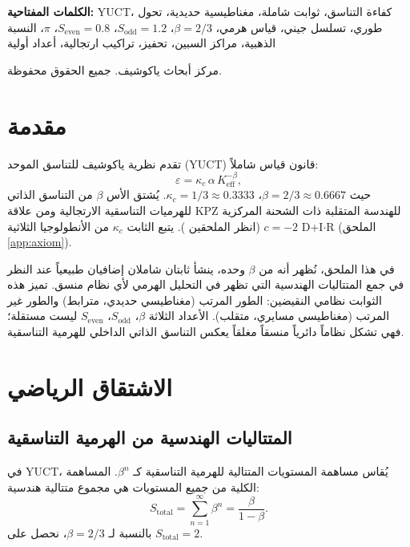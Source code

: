 \documentclass[11pt,a4paper]{article}
\begin{document}
\begin{titlepage}
\begin{center}
			\vspace{0.5cm}
			\noindent
			\footnotesize\textbf{الكلمات المفتاحية:} YUCT، كفاءة التناسق، ثوابت شاملة، مغناطيسية حديدية، تحول طوري، تسلسل جيني، قياس هرمي، \(\beta = 2/3\)، \(S_{\text{odd}} = 1.2\)، \(S_{\text{even}} = 0.8\)، \(\pi\)، النسبة الذهبية، مراكز السبين، تحفيز، تراكيب ارتجالية، أعداد أولية
			
			\vspace{0.3cm}
			\noindent
			\footnotesize{} مركز أبحاث ياكوشيف. جميع الحقوق محفوظة.
		\end{center}
	\end{titlepage}
	
	\tableofcontents
	\newpage
	
	\section{مقدمة}
	تقدم نظرية ياكوشيف للتناسق الموحد (YUCT) قانون قياس شاملاً:
	\[
	\varepsilon = \kappa_c \, \alpha \, K_{\mathrm{eff}}^{-\beta},
	\]
	حيث \(\beta = 2/3 \approx 0.6667\)، \(\kappa_c = 1/3 \approx 0.3333\). يُشتق الأس \(\beta\) من التناسق الذاتي للهرميات التناسقية الارتجالية ومن علاقة KPZ للهندسة المتقلبة ذات الشحنة المركزية \(c = -2\) (انظر الملحقين \cite{AppendixL, AppendixY}). يتبع الثابت \(\kappa_c\) من الأنطولوجيا الثلاثية D+I\(\cdot\)R (الملحق \ref{app:axiom}).
	
	في هذا الملحق، نُظهر أنه من \(\beta\) وحده، ينشأ ثابتان شاملان إضافيان طبيعياً عند النظر في جمع المتتاليات الهندسية التي تظهر في التحليل الهرمي لأي نظام منسق. تميز هذه الثوابت نظامي النقيضين: الطور المرتب (مغناطيسي حديدي، مترابط) والطور غير المرتب (مغناطيسي مسايري، متقلب). الأعداد الثلاثة \(\beta\)، \(S_{\text{odd}}\)، \(S_{\text{even}}\) ليست مستقلة؛ فهي تشكل نظاماً دائرياً منسقاً مغلقاً يعكس التناسق الذاتي الداخلي للهرمية التناسقية.
	
	\section{الاشتقاق الرياضي}
	
	\subsection{المتتاليات الهندسية من الهرمية التناسقية}
	في YUCT، يُقاس مساهمة المستويات المتتالية للهرمية التناسقية كـ \(\beta^n\). المساهمة الكلية من جميع المستويات هي مجموع متتالية هندسية:
	\[
	S_{\text{total}} = \sum_{n=1}^{\infty} \beta^n = \frac{\beta}{1-\beta}.
	\]
	بالنسبة لـ \(\beta = 2/3\)، نحصل على \(S_{\text{total}} = 2\).
	
\end{document}
